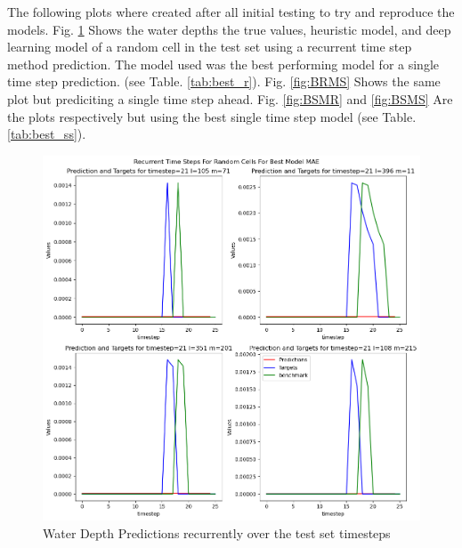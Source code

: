 The following plots where created after all initial testing to try and reproduce the models. Fig. \ref{fig:BRMR} Shows the water depths the true values, heuristic model, and deep learning model of a random cell in the test set using a recurrent time step method prediction. The model used was the best performing model for a single time step prediction.  (see Table. \ref{tab:best_r}). Fig. \ref{fig:BRMS} Shows the same plot but prediciting a single time step ahead. Fig. \ref{fig:BSMR} and \ref{fig:BSMS} Are the plots respectively but using the best single time step model (see Table. \ref{tab:best_ss}).

\begin{figure}[tbph]
	\centering
	\includegraphics[width=0.8\linewidth, height=0.3\textheight]{Figures/Results/Final_Results/Best_Model_recurrentMAE_recurrent_random_cell}
	\caption[Best Recurrent MAE random cell over time]{Water Depth Predictions recurrently over the test set timesteps}
	\label{fig:BRMR}
\end{figure}



